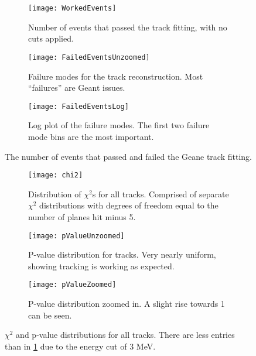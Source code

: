 \begin{figure}
    \centering
    \begin{subfigure}[]{0.7\textwidth}
        \centering
        \texttt{[image: WorkedEvents]} 
        \caption{Number of events that passed the track fitting, with no cuts applied.}
        \label{fig:worked}
    \end{subfigure}
    
    \begin{subfigure}[]{0.7\textwidth}
        \centering
        \texttt{[image: FailedEventsUnzoomed]} 
        \caption{Failure modes for the track reconstruction. Most ``failures'' are Geant issues.}
    \end{subfigure}

    \begin{subfigure}[]{0.7\textwidth}
        \centering
        \texttt{[image: FailedEventsLog]} 
        \caption{Log plot of the failure modes. The first two failure mode bins are the most important.}
    \end{subfigure}

    \caption{The number of events that passed and failed the Geane track fitting.}
\end{figure}



\begin{figure}
    \centering
    \begin{subfigure}[]{0.7\textwidth}
        \centering
        \texttt{[image: chi2]} 
        \caption{Distribution of $\chi^{2}$s for all tracks. Comprised of separate $\chi^{2}$ distributions with degrees of freedom equal to the number of planes hit minus 5.}
    \end{subfigure}
    
    \begin{subfigure}[]{0.7\textwidth}
        \centering
        \texttt{[image: pValueUnzoomed]} 
        \caption{P-value distribution for tracks. Very nearly uniform, showing tracking is working as expected.}
    \end{subfigure}

    \begin{subfigure}[]{0.7\textwidth}
        \centering
        \texttt{[image: pValueZoomed]} 
        \caption{P-value distribution zoomed in. A slight rise towards 1 can be seen.}
    \end{subfigure}

    \caption{$\chi^{2}$ and p-value distributions for all tracks. There are less entries than in \ref{fig:worked} due to the energy cut of 3 MeV.}
\end{figure}



